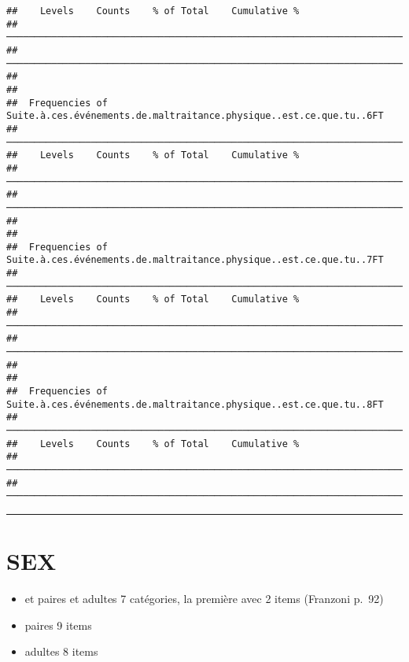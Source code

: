 \documentclass[
]{article}
\providecommand{\tightlist}{%
  \setlength{\itemsep}{0pt}\setlength{\parskip}{0pt}}
\begin{document}
\begin{verbatim}
##    Levels    Counts    % of Total    Cumulative %   
##  ────────────────────────────────────────────────────────────────────────────────── 
##  ────────────────────────────────────────────────────────────────────────────────── 
## 
## 
##  Frequencies of Suite.à.ces.événements.de.maltraitance.physique..est.ce.que.tu..6FT 
##  ────────────────────────────────────────────────────────────────────────────────── 
##    Levels    Counts    % of Total    Cumulative %   
##  ────────────────────────────────────────────────────────────────────────────────── 
##  ────────────────────────────────────────────────────────────────────────────────── 
## 
## 
##  Frequencies of Suite.à.ces.événements.de.maltraitance.physique..est.ce.que.tu..7FT 
##  ────────────────────────────────────────────────────────────────────────────────── 
##    Levels    Counts    % of Total    Cumulative %   
##  ────────────────────────────────────────────────────────────────────────────────── 
##  ────────────────────────────────────────────────────────────────────────────────── 
## 
## 
##  Frequencies of Suite.à.ces.événements.de.maltraitance.physique..est.ce.que.tu..8FT 
##  ────────────────────────────────────────────────────────────────────────────────── 
##    Levels    Counts    % of Total    Cumulative %   
##  ────────────────────────────────────────────────────────────────────────────────── 
##  ──────────────────────────────────────────────────────────────────────────────────
\end{verbatim}

\begin{center}\rule{0.5\linewidth}{0.5pt}\end{center}

\hypertarget{sex}{%
\section{SEX}\label{sex}}

\begin{itemize}
\tightlist
\item
  et paires et adultes 7 catégories, la première avec 2 items (Franzoni
  p.~92)
\item
  paires 9 items
\item
  adultes 8 items
\end{itemize}
\end{document}
